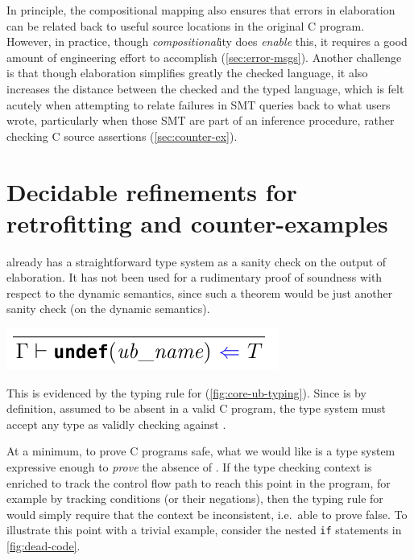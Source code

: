 In principle, the compositional mapping also ensures that errors in 
elaboration can be related back to useful source locations in the original C
program. However, in practice, though \emph{compositional}ity does
\emph{enable} this, it requires a good amount of engineering effort to
accomplish (\cref{sec:error-msgs}). Another challenge is that though
elaboration simplifies greatly the checked language, it also increases the
distance between the checked and the typed language, which is felt acutely when
attempting to relate failures in SMT queries back to what users wrote,
particularly when those SMT are part of an inference procedure, rather checking
C source assertions (\cref{sec:counter-ex}).

\section{Decidable refinements for retrofitting and counter-examples}

 already has a straightforward  type system as a
sanity check on the output of elaboration. It has not been used for a
rudimentary proof of soundness with respect to the dynamic semantics, since
such a theorem would be just another sanity check (on the dynamic semantics).

\begin{marginfigure}
    \centering
    \includegraphics{figures/core-ub-typing}
    \caption{Typing rule for the  pure expression as %
        mentioned in \textcite{memarian2022cerberus}. The type system is set up
        in a  way, with checking judgements represented by
        $\color{blue}{\Leftarrow}$, and synthesis with
        $\color{red}{\Rightarrow}$.}\label{fig:core-ub-typing}
\end{marginfigure}

This is evidenced by the typing rule for  %
(\cref{fig:core-ub-typing}). Since  is by definition, assumed to be
absent in a valid C program, the type system must accept any type as validly
checking against . %

At a minimum, to prove C programs safe, what we would like is a type system
expressive enough to \emph{prove} the absence of . If the type checking
context is enriched to track the control flow path to reach this point in the
program, for example by tracking conditions (or their negations), then the
typing rule for  would simply require that the context %
be inconsistent, i.e.\ able to prove false. To illustrate this point with
a trivial example, consider the nested \texttt{if} statements in
\cref{fig:dead-code}.

